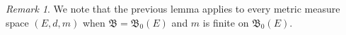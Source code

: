 \documentclass[JEP,XML,SOM,Unicode,published]{cedram}
\theoremstyle{definition}
\theoremstyle{remark}
\newtheorem{remark}[theorem]{Remark}
\begin{document}
\begin{remark}
We note that the previous lemma applies to every metric measure space $(E,d,m)$ when $\mathfrak{B}=\mathfrak{B}_0(E)$ and $m$ is finite on $\mathfrak{B}_0(E)$.
\end{remark}




\end{document}
